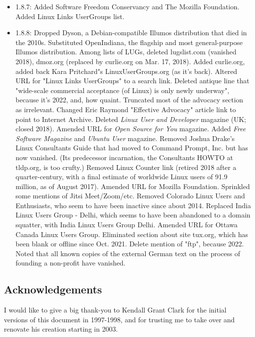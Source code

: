 \begin{itemize}
\item 1.8.7:  Added Software Freedom Conservancy and The Mozilla
Foundation.  Added Linux Links UserGroups list.
\item 1.8.8:  Dropped Dyson, a Debian-compatible Illumos
distribution that died in the 2010s.  Substituted OpenIndiana, the
flagship and most general-purpose Illumos distribution.  Among lists of
LUGs, deleted lugslist.com (vanished 2018), dmoz.org (replaced by
curlie.org on Mar. 17, 2018).  Added curlie.org, added back Kara Pritchard"s 
LinuxUserGroups.org (as it's back).  Altered URL for "Linux Links
UserGroups" to a search link.  Deleted antique line that "wide-scale commercial acceptance 
(of Linux) is only newly underway", because it's 2022, and, how quaint.  Truncated most 
of the advocacy section as irrelevant.  Changed Eric Raymond "Effective Advocacy" article 
link to point to Internet Archive.
Deleted {\itshape Linux User and Developer\/} magazine (UK; closed 2018). Amended URL for 
{\itshape Open Source for You\/} magazine.  Added {\itshape Free Software Magazine\/} and 
{\itshape Ubuntu User\/} magazine.  Removed 
Joshua Drake's Linux Consultants Guide that had moved to Command Prompt, Inc. but
has now vanished.  (Its predecessor incarnation, the Consultants HOWTO at tldp.org, 
is too crufty.)  Removed Linux Counter link (retired 2018 after a quarter-century, 
with a final estimate of worldwide Linux users of 91.9 million, as of August 2017).
Amended URL for Mozilla Foundation.  Sprinkled some mentions of Jitsi Meet/Zoom/etc.
Removed Colorado Linux Users and Enthusiasts, who seem to have been inactive since 
about 2014.  Replaced India Linux Users Group - Delhi, which seems to have been abandoned 
to a domain squatter, with India Linux Users Group Delhi.  Amended URL for Ottawa 
Canada Linux Users Group.  Eliminated section about site tux.org, which has been blank
or offline since Oct. 2021.  Delete mention of "ftp", because 2022.  Noted that 
all known copies of the external German text on the process of founding a non-profit have 
vanished.
\end{itemize}

\subsection{Acknowledgements}

I would like to give a big thank-you to Kendall Grant Clark for the 
initial versions of this document in 1997-1998, and for trusting me to take
over and renovate his creation starting in 2003.

